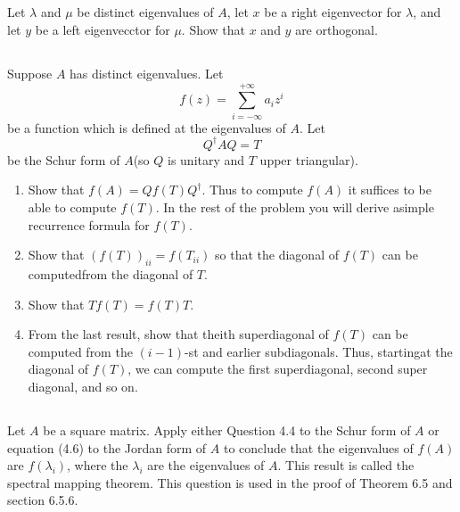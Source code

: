 \documentclass[a4paper]{ctexart}
\newcommand{\pf}{\textbf{\color{pink}{proof:}}}
\begin{document}
\pf

\subsection{}
Let $\lambda$ and $\mu$ be distinct eigenvalues of $A$, let $x$ be a right eigenvector for $\lambda$, and let $y$ be a left eigenvecctor for $\mu$.  Show that $x$ and $y$ are orthogonal.

\pf

\subsection{}
Suppose $A$ has  distinct  eigenvalues.   Let 
\begin{equation*}
    f(z) = \sum_{i=-\infty}^{+\infty}a_i z^i
\end{equation*}
be a function which is defined at the eigenvalues of $A$. Let
\begin{equation*}
    Q^\dag A Q = T
\end{equation*}
be the Schur form of $A$(so $Q$ is unitary and $T$ upper triangular).
\begin{enumerate}
    \item  Show  that $f(A)=Qf(T)Q^\dag$.   Thus  to  compute $f(A)$  it  suffices  to  be able  to  compute $f(T)$.   In  the  rest  of  the  problem  you  will  derive  asimple recurrence formula for $f(T)$.
    \item  Show that $(f(T))_{ii}=f(T_{ii})$ so that the diagonal of $f(T)$ can be computedfrom the diagonal of $T$.
    \item  Show that $Tf(T)=f(T)T$.
    \item From  the  last  result,  show  that  theith  superdiagonal  of $f(T)$ can be computed  from  the  $(i-1)$-st  and  earlier  subdiagonals.   Thus,  startingat the diagonal of $f(T)$, we can compute the first superdiagonal, second super diagonal, and so on.
\end{enumerate}

\pf

\subsection{}
Let $A$ be a square matrix. Apply either Question 4.4
to the Schur form of $A$ or equation (4.6) to the Jordan form of $A$ to conclude
that the eigenvalues of $f(A)$ are $f(\lambda_i)$, where the $\lambda_i$ are the eigenvalues of $A$.
This result is called the spectral mapping theorem.
This question is used in the proof of Theorem 6.5 and section 6.5.6.
\end{document}
